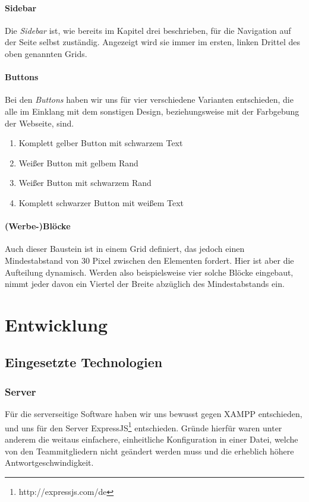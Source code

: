 \documentclass[12pt,a4paper]{article}
\begin{document}
\paragraph{Sidebar}
Die \textit{Sidebar} ist, wie bereits im Kapitel drei beschrieben, für die Navigation auf der Seite selbst zuständig. Angezeigt wird sie immer im ersten, linken Drittel des oben genannten Grids.
\paragraph{Buttons}
Bei den \textit{Buttons} haben wir uns für vier verschiedene Varianten entschieden, die alle im Einklang mit dem sonstigen Design, beziehungsweise mit der Farbgebung der Webseite, sind.
\begin{enumerate}
\item{Komplett gelber Button mit schwarzem Text}
\item{Weißer Button mit gelbem Rand}
\item{Weißer Button mit schwarzem Rand}
\item{Komplett schwarzer Button mit weißem Text}
\end{enumerate}
\paragraph{(Werbe-)Blöcke}
Auch dieser Baustein ist in einem Grid definiert, das jedoch einen Mindestabstand von 30 Pixel zwischen den Elementen fordert. Hier ist aber die Aufteilung dynamisch. Werden also beispielsweise vier solche Blöcke eingebaut, nimmt jeder davon ein Viertel der Breite abzüglich des Mindestabstands ein.
\section{Entwicklung}
\subsection{Eingesetzte Technologien}
\subsubsection{Server}
Für die serverseitige Software haben wir uns bewusst gegen XAMPP entschieden, und uns für den Server ExpressJS\footnote{\label{foot:1} http://expressjs.com/de} entschieden. Gründe hierfür waren unter anderem die weitaus einfachere, einheitliche Konfiguration in einer Datei, welche von den Teammitgliedern nicht geändert werden muss und die erheblich höhere Antwortgeschwindigkeit.
\end{document}
